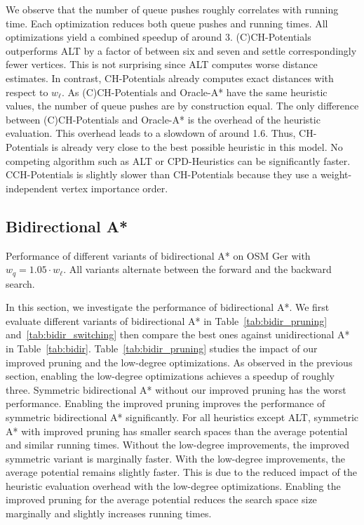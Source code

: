 \documentclass[manuscript]{acmart}
\begin{document}
We observe that the number of queue pushes roughly correlates with running time.
Each optimization reduces both queue pushes and running times.
All optimizations yield a combined speedup of around 3.
(C)CH-Potentials outperforms ALT by a factor of between six and seven and settle correspondingly fewer vertices.
This is not surprising since ALT computes worse distance estimates.
In contrast, CH-Potentials already computes exact distances with respect to $w_\ell$.
As (C)CH-Potentials and Oracle-A* have the same heuristic values, the number of queue pushes are by construction equal.
The only difference between (C)CH-Potentials and Oracle-A* is the overhead of the heuristic evaluation.
This overhead leads to a slowdown of around 1.6.
Thus, CH-Potentials is already very close to the best possible heuristic in this model.
No competing algorithm such as ALT or CPD-Heuristics can be significantly faster.
CCH-Potentials is slightly slower than CH-Potentials because they use a weight-independent vertex importance order.

\subsection{Bidirectional A*}

\begin{table}
\centering
\caption{
Performance of different variants of bidirectional A* on OSM Ger with $w_q = 1.05 \cdot w_\ell$.
All variants alternate between the forward and the backward search.}
\label{tab:bidir_pruning}

\end{table}

In this section, we investigate the performance of bidirectional A*.
We first evaluate different variants of bidirectional A* in Table~\ref{tab:bidir_pruning} and~\ref{tab:bidir_switching} then compare the best ones against unidirectional A* in Table~\ref{tab:bidir}.
Table~\ref{tab:bidir_pruning} studies the impact of our improved pruning and the low-degree optimizations.
As observed in the previous section, enabling the low-degree optimizations achieves a speedup of roughly three.
Symmetric bidirectional A* without our improved pruning has the worst performance.
Enabling the improved pruning improves the performance of symmetric bidirectional A* significantly.
For all heuristics except ALT, symmetric A* with improved pruning has smaller search spaces than the average potential and similar running times.
Without the low-degree improvements, the improved symmetric variant is marginally faster.
With the low-degree improvements, the average potential remains slightly faster.
This is due to the reduced impact of the heuristic evaluation overhead with the low-degree optimizations.
Enabling the improved pruning for the average potential reduces the search space size marginally and slightly increases running times.
\end{document}
